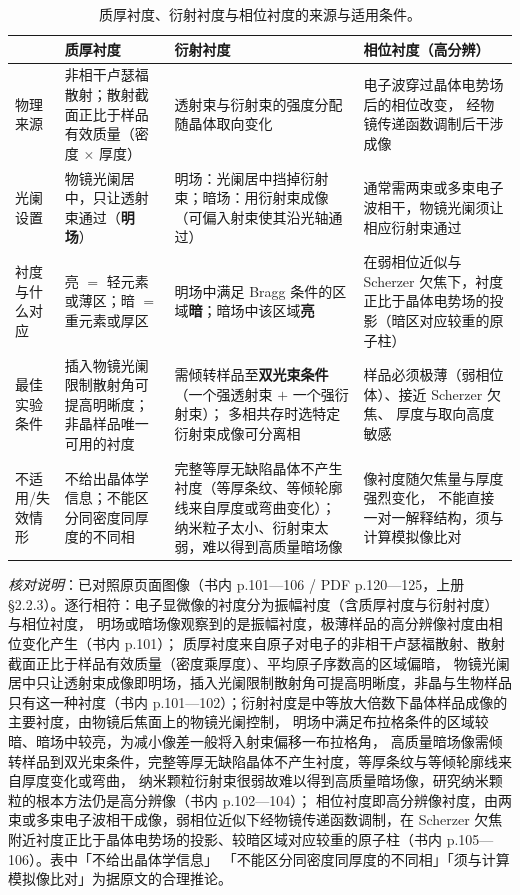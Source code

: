\begin{table}[htbp]
\centering
\caption{质厚衬度、衍射衬度与相位衬度的来源与适用条件。}
\label{tab:contrast}
{\srcsize
\begin{tabularx}{\columnwidth}{@{}p{}XXX@{}}
\toprule
 & 质厚衬度 & 衍射衬度 & 相位衬度（高分辨） \\
\midrule
物理来源 & 非相干卢瑟福散射；散射截面正比于样品有效质量（密度 $\times$ 厚度） &
透射束与衍射束的强度分配随晶体取向变化 & 电子波穿过晶体电势场后的相位改变，
经物镜传递函数调制后干涉成像 \\
光阑设置 & 物镜光阑居中，只让透射束通过（\textbf{明场}） &
明场：光阑居中挡掉衍射束；暗场：用衍射束成像（可偏入射束使其沿光轴通过） &
通常需两束或多束电子波相干，物镜光阑须让相应衍射束通过 \\
衬度与什么对应 & 亮 $=$ 轻元素或薄区；暗 $=$ 重元素或厚区 &
明场中满足 Bragg 条件的区域\textbf{暗}；暗场中该区域\textbf{亮} &
在弱相位近似与 Scherzer 欠焦下，衬度正比于晶体电势场的投影（暗区对应较重的原子柱） \\
最佳实验条件 & 插入物镜光阑限制散射角可提高明晰度；非晶样品唯一可用的衬度 &
需倾转样品至\textbf{双光束条件}（一个强透射束 $+$ 一个强衍射束）；
多相共存时选特定衍射束成像可分离相 & 样品必须极薄（弱相位体）、接近 Scherzer 欠焦、
厚度与取向高度敏感 \\
不适用/失效情形 & 不给出晶体学信息；不能区分同密度同厚度的不同相 &
完整等厚无缺陷晶体不产生衬度（等厚条纹、等倾轮廓线来自厚度或弯曲变化）；
纳米粒子太小、衍射束太弱，难以得到高质量暗场像 & 像衬度随欠焦量与厚度强烈变化，
不能直接一对一解释结构，须与计算模拟像比对 \\
\bottomrule
\end{tabularx}}
\end{table}

\emph{核对说明}：已对照原页面图像（书内 p.101—106 / PDF p.120—125，上册 
§2.2.3）。逐行相符：电子显微像的衬度分为振幅衬度（含质厚衬度与衍射衬度）与相位衬度，
明场或暗场像观察到的是振幅衬度，极薄样品的高分辨像衬度由相位变化产生（书内 p.101）；
质厚衬度来自原子对电子的非相干卢瑟福散射、散射截面正比于样品有效质量（密度乘厚度）、平均原子序数高的区域偏暗，
物镜光阑居中只让透射束成像即明场，插入光阑限制散射角可提高明晰度，非晶与生物样品只有这一种衬度（书内 
p.101—102）；衍射衬度是中等放大倍数下晶体样品成像的主要衬度，由物镜后焦面上的物镜光阑控制，
明场中满足布拉格条件的区域较暗、暗场中较亮，为减小像差一般将入射束偏移一布拉格角，
高质量暗场像需倾转样品到双光束条件，完整等厚无缺陷晶体不产生衬度，等厚条纹与等倾轮廓线来自厚度变化或弯曲，
纳米颗粒衍射束很弱故难以得到高质量暗场像，研究纳米颗粒的根本方法仍是高分辨像（书内 p.102—104）；
相位衬度即高分辨像衬度，由两束或多束电子波相干成像，弱相位近似下经物镜传递函数调制，在 Scherzer 
欠焦附近衬度正比于晶体电势场的投影、较暗区域对应较重的原子柱（书内 p.105—106）。表中「不给出晶体学信息」
「不能区分同密度同厚度的不同相」「须与计算模拟像比对」为据原文的合理推论。


